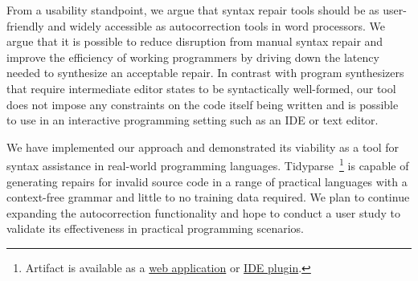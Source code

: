 \documentclass[runningheads]{llncs}
\begin{document}
From a usability standpoint, we argue that syntax repair tools should be as user-friendly and widely accessible as autocorrection tools in word processors. We argue that it is possible to reduce disruption from manual syntax repair and improve the efficiency of working programmers by driving down the latency needed to synthesize an acceptable repair. In contrast with program synthesizers that require intermediate editor states to be syntactically well-formed, our tool does not impose any constraints on the code itself being written and is possible to use in an interactive programming setting such as an IDE or text editor.

We have implemented our approach and demonstrated its viability as a tool for syntax assistance in real-world programming languages. Tidyparse~\footnote{Artifact is available as a \href{http://tidyparse.github.io}{web application} or \href{https://plugins.jetbrains.com/plugin/19570-tidyparse}{IDE plugin}.} is capable of generating repairs for invalid source code in a range of practical languages with a context-free grammar and little to no training data required. We plan to continue expanding the autocorrection functionality and hope to conduct a user study to validate its effectiveness in practical programming scenarios.


\clearpage
\end{document}
